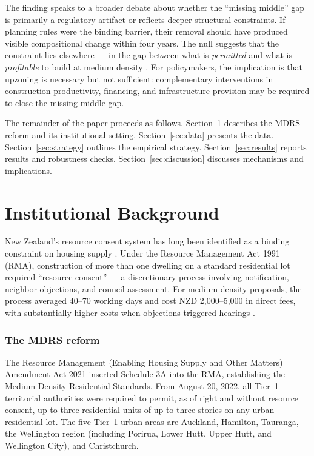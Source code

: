 \documentclass[12pt]{article}
\begin{document}
The finding speaks to a broader debate about whether the ``missing middle'' gap \citep{parolek2020missing} is primarily a regulatory artifact or reflects deeper structural constraints. If planning rules were the binding barrier, their removal should have produced visible compositional change within four years. The null suggests that the constraint lies elsewhere --- in the gap between what is \textit{permitted} and what is \textit{profitable} to build at medium density \citep{nzpc2012housing, mfe2020national}. For policymakers, the implication is that upzoning is necessary but not sufficient: complementary interventions in construction productivity, financing, and infrastructure provision may be required to close the missing middle gap.

The remainder of the paper proceeds as follows. Section~\ref{sec:background} describes the MDRS reform and its institutional setting. Section~\ref{sec:data} presents the data. Section~\ref{sec:strategy} outlines the empirical strategy. Section~\ref{sec:results} reports results and robustness checks. Section~\ref{sec:discussion} discusses mechanisms and implications.


\section{Institutional Background}
\label{sec:background}

New Zealand's resource consent system has long been identified as a binding constraint on housing supply \citep{nzpc2012housing}. Under the Resource Management Act 1991 (RMA), construction of more than one dwelling on a standard residential lot required ``resource consent'' --- a discretionary process involving notification, neighbor objections, and council assessment. For medium-density proposals, the process averaged 40--70 working days and cost NZD 2,000--5,000 in direct fees, with substantially higher costs when objections triggered hearings \citep{mfe2020national}.

\subsubsection*{The MDRS reform} The Resource Management (Enabling Housing Supply and Other Matters) Amendment Act 2021 inserted Schedule 3A into the RMA, establishing the Medium Density Residential Standards. From August 20, 2022, all Tier~1 territorial authorities were required to permit, as of right and without resource consent, up to three residential units of up to three stories on any urban residential lot. The five Tier~1 urban areas are Auckland, Hamilton, Tauranga, the Wellington region (including Porirua, Lower Hutt, Upper Hutt, and Wellington City), and Christchurch.
\end{document}
